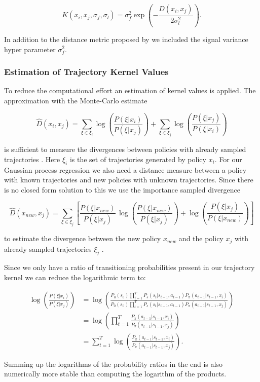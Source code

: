 \begin{equation} \label{eq:trajKernel}
K(x_{ i },x_{ j },\sigma_f,\sigma_l) = \sigma_f^2 \exp\left(-\frac{D(x_i,x_j)}{2\sigma_l^2} \right).
\end{equation}

In addition to the distance metric proposed by \cite{wilson2014using} we included the signal variance hyper parameter $\sigma_f^2$.

\subsubsection{Estimation of Trajectory Kernel Values}
To reduce the computational effort an estimation of kernel values is applied. The approximation with the Monte-Carlo estimate

\begin{equation} \label{eq:tk:mc}
    \hat{D}(x_{ i }, x_{ j }) = \sum _{\xi \in \xi_i} \log\left( \frac{P(\xi|x_{ i })}{P(\xi|x_{ j })} \right) + \sum _{\xi \in \xi_j} \log\left( \frac{P(\xi|x_{ j })}{P(\xi|x_{ i })} \right)
\end{equation}

is sufficient to measure the divergences between policies with already sampled trajectories \cite{wilson2014using}. Here $\xi_i$ is the set of trajectories generated by policy $x_i$. For our Gaussian process regression we also need a distance measure between a policy with known trajectories and new policies with unknown trajectories. Since there is no closed form solution to this we use the importance sampled divergence

$$\hat{D}(x_{ new }, x_{ j }) = \sum _{\xi \in \xi_j} \left[\frac{P(\xi|x_{ new })}{P(\xi|x_{ j })}\,\log\left(\frac{P(\xi|x_{new})}{P(\xi|x_{j})}\right)+\log\left(\frac{P(\xi|x_{ j })}{P(\xi|x_{ new })}\right)\right] $$

to estimate the divergence between the new policy $x_{new}$ and the policy $x_j$ with already sampled trajectories $\xi_j$ \cite{wilson2014using}.

Since we only have a ratio of transitioning probabilities present in our trajectory kernel we can reduce the logarithmic term to:

\begin{align*}
    \log\left(\frac{P(\xi|x_i)}{P(\xi|x_j)}\right)
    &= \log\left(\frac{P_{0}(s_{0}) \prod_{t=1}^{T} P_s(s_{t}|s_{t-1},a_{t-1}) P_{\pi}(a_{t-1}|s_{t-1},x_i)}{P_{0}(s_{0}) \prod_{t=1}^{T} P_s(s_{t}|s_{t-1},a_{t-1}) P_{\pi}(a_{t-1}|s_{t-1},x_j)}\right)\\
    &= \log\left(\prod_{t=1}^{T}\frac{ P_{\pi}(a_{t-1}|s_{t-1},x_i)}{P_{\pi}(a_{t-1}|s_{t-1},x_j)}\right)\\
    &= \sum_{t=1}^{T} \log \left(\frac{P_{\pi}(a_{t-1}|s_{t-1},x_i)}{P_{\pi}(a_{t-1}|s_{t-1},x_j)}\right).
\end{align*}

Summing up the logarithms of the probability ratios in the end is also numerically more stable than computing the logarithm of the products.
